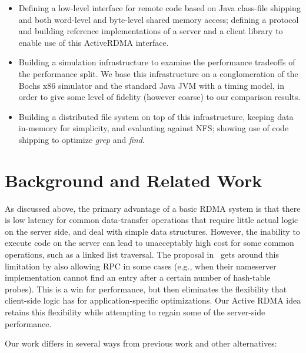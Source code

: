 \documentclass[10pt]{article}
\begin{document}
\begin{itemize} \itemsep -2pt

\item Defining a low-level interface for remote code based on Java
  class-file shipping and both word-level and byte-level shared memory
  access; defining a protocol and building reference implementations
  of a server and a client library to enable use of this ActiveRDMA
  interface.

\item Building a simulation infrastructure to examine the performance
  tradeoffs of the performance split. We base this infrastructure on a
  conglomeration of the Bochs x86 simulator and the standard Java JVM
  with a timing model, in order to give some level of fidelity
  (however coarse) to our comparison results.

\item Building a distributed file system on top of this
  infrastructure, keeping data in-memory for simplicity, and
  evaluating against NFS; showing use of code shipping to optimize
  \emph{grep} and \emph{find}.

\end{itemize}

\section{Background and Related Work}

As discussed above, the primary advantage of a basic RDMA system is
that there is low latency for common data-transfer operations that
require little actual logic on the server side, and deal with simple
data structures. However, the inability to execute code on the server
can lead to unacceptably high cost for some common operations, such as
a linked list traversal. The proposal in~\cite{thekkath94} gets around
this limitation by also allowing RPC in some cases (e.g., when their
nameserver implementation cannot find an entry after a certain number
of hash-table probes). This is a win for performance, but then
eliminates the flexibility that client-side logic has for
application-specific optimizations. Our Active RDMA idea retains this
flexibility while attempting to regain some of the server-side
performance.

Our work differs in several ways from previous work and other
alternatives:
\end{document}
